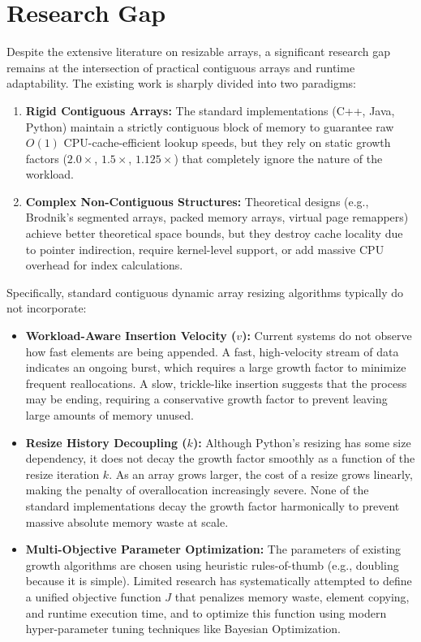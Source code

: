 \section{Research Gap}
Despite the extensive literature on resizable arrays, a significant research gap 
remains at the intersection of practical contiguous arrays and runtime 
adaptability. The existing work is sharply divided into two paradigms:
\begin{enumerate}
    \item \textbf{Rigid Contiguous Arrays:} The standard implementations (C++, Java, 
    Python) maintain a strictly contiguous block of memory to guarantee raw 
    $O(1)$ CPU-cache-efficient lookup speeds, but they rely on static growth 
    factors ($2.0\times$, $1.5\times$, $1.125\times$) that completely ignore the 
    nature of the workload.
    \item \textbf{Complex Non-Contiguous Structures:} Theoretical designs (e.g., 
    Brodnik's segmented arrays, packed memory arrays, virtual page remappers) 
    achieve better theoretical space bounds, but they destroy cache locality 
    due to pointer indirection, require kernel-level support, or add massive 
    CPU overhead for index calculations.
\end{enumerate}

Specifically, standard contiguous dynamic array resizing algorithms typically do not incorporate:
\begin{itemize}
    \item \textbf{Workload-Aware Insertion Velocity ($v$):} Current systems 
    do not observe how fast elements are being appended. A fast, high-velocity 
    stream of data indicates an ongoing burst, which requires a large growth 
    factor to minimize frequent reallocations. A slow, trickle-like insertion 
    suggests that the process may be ending, requiring a conservative growth 
    factor to prevent leaving large amounts of memory unused.
    \item \textbf{Resize History Decoupling ($k$):} Although Python's resizing 
    has some size dependency, it does not decay the growth factor smoothly as 
    a function of the resize iteration $k$. As an array grows larger, the cost 
    of a resize grows linearly, making the penalty of overallocation increasingly 
    severe. None of the standard implementations decay the growth factor 
    harmonically to prevent massive absolute memory waste at scale.
    \item \textbf{Multi-Objective Parameter Optimization:} The parameters 
    of existing growth algorithms are chosen using heuristic rules-of-thumb 
    (e.g., doubling because it is simple). Limited research has systematically attempted 
    to define a unified objective function $J$ that penalizes memory waste, 
    element copying, and runtime execution time, and to optimize this function 
    using modern hyper-parameter tuning techniques like Bayesian Optimization.
\end{itemize}

